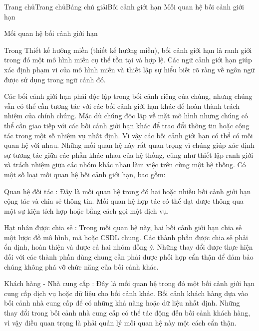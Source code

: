 

Trang chủTrang chủBảng chú giảiBối cảnh giới hạn Mối quan hệ bối cảnh giới hạn

Mối quan hệ bối cảnh giới hạn

Trong Thiết kế hướng miền (thiết kế hướng miền), bối cảnh giới hạn là ranh giới trong đó một mô hình miền cụ thể tồn tại và hợp lệ. Các ngữ cảnh giới hạn giúp xác định phạm vi của mô hình miền và thiết lập sự hiểu biết rõ ràng về ngôn ngữ được sử dụng trong ngữ cảnh đó.

Các bối cảnh giới hạn phải độc lập trong bối cảnh riêng của chúng, nhưng chúng vẫn có thể cần tương tác với các bối cảnh giới hạn khác để hoàn thành trách nhiệm của chính chúng. Mặc dù chúng độc lập về mặt mô hình nhưng chúng có thể cần giao tiếp với các bối cảnh giới hạn khác để trao đổi thông tin hoặc cộng tác trong một số nhiệm vụ nhất định. Vì vậy các bối cảnh giới hạn có thể có mối quan hệ với nhau. Những mối quan hệ này rất quan trọng vì chúng giúp xác định sự tương tác giữa các phần khác nhau của hệ thống, cũng như thiết lập ranh giới và trách nhiệm giữa các nhóm khác nhau làm việc trên cùng một hệ thống. Có một số loại mối quan hệ bối cảnh giới hạn, bao gồm:

Quan hệ đối tác : Đây là mối quan hệ trong đó hai hoặc nhiều bối cảnh giới hạn cộng tác và chia sẻ thông tin. Mối quan hệ hợp tác có thể đạt được thông qua một sự kiện tích hợp hoặc bằng cách gọi một dịch vụ.

Hạt nhân được chia sẻ : Trong mối quan hệ này, hai bối cảnh giới hạn chia sẻ một lược đồ mô hình, mã hoặc CSDL chung. Các thành phần được chia sẻ phải ổn định, hoàn thiện và được cả hai nhóm đồng ý. Những thay đổi được thực hiện đối với các thành phần dùng chung cần phải được phối hợp cẩn thận để đảm bảo chúng không phá vỡ chức năng của bối cảnh khác.

Khách hàng - Nhà cung cấp : Đây là mối quan hệ trong đó một bối cảnh giới hạn cung cấp dịch vụ hoặc dữ liệu cho bối cảnh khác. Bối cảnh khách hàng dựa vào bối cảnh nhà cung cấp để có những khả năng hoặc dữ liệu nhất định. Những thay đổi trong bối cảnh nhà cung cấp có thể tác động đến bối cảnh khách hàng, vì vậy điều quan trọng là phải quản lý mối quan hệ này một cách cẩn thận.

